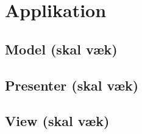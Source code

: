 \chapter{Applikation}

\section{Model (skal væk)}



\section{Presenter (skal væk)}

\section{View (skal væk)}








